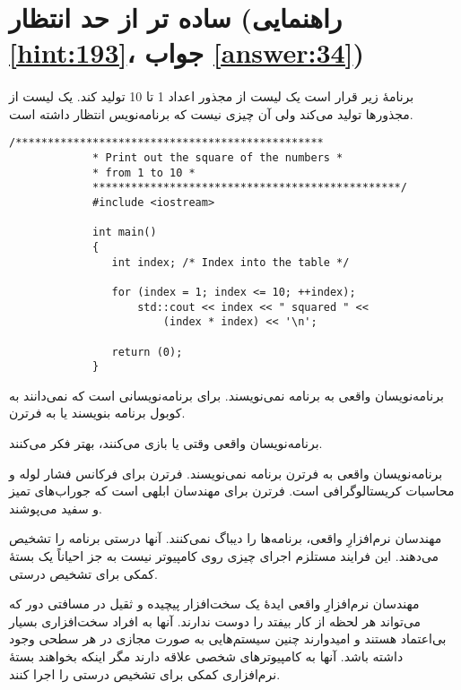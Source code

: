 \section[ساده تر از حد انتظار]{ساده تر از حد انتظار \protect{} (راهنمایی \ref{hint:193}، جواب \ref{answer:34})}
\paragraph{}\label{prog:20}
برنامهٔ زیر قرار است یک لیست از مجذور اعداد 1 تا 10 تولید کند. یک لیست از مجذورها تولید می‌کند ولی آن چیزی نیست که برنامه‌نویس انتظار داشته است.

\begin{LTR}
        \begin{lstlisting}[style=C++Style]
             /************************************************
             * Print out the square of the numbers *
             * from 1 to 10 *
             ************************************************/
             #include <iostream>

             int main()
             {
             	int index; /* Index into the table */

             	for (index = 1; index <= 10; ++index);
             		std::cout << index << " squared " <<
             			(index * index) << '\n';

             	return (0);
             }
        \end{lstlisting}
\end{LTR}

\begin{tcolorbox}
    برنامه‌نویسان واقعی به  برنامه نمی‌نویسند.  برای برنامه‌نویسانی است که نمی‌دانند به کوبول برنامه بنویسند یا به فرترن.

    برنامه‌نویسان واقعی وقتی  یا  بازی می‌کنند، بهتر فکر می‌کنند.

    برنامه‌نویسان واقعی به فرترن برنامه نمی‌نویسند. فرترن برای فرکانس فشار لوله و محاسبات کریستالوگرافی است. فرترن برای مهندسان ابلهی است که جوراب‌های تمیز و سفید می‌پوشند.

    مهندسان نرم‌افزارِ واقعی، برنامه‌ها را دیباگ نمی‌کنند. آنها درستی برنامه را تشخیص می‌دهند. این فرایند مستلزم اجرای چیزی روی کامپیوتر نیست به جز احیاناً یک بستهٔ کمکی برای تشخیص درستی.

    مهندسان نرم‌افزارِ واقعی ایدهٔ یک سخت‌افزار پیچیده و ثقیل در مسافتی دور که می‌تواند هر لحظه از کار بیفتد را دوست ندارند. آنها به افراد سخت‌افزاری بسیار بی‌اعتماد هستند و امیدوارند چنین سیستم‌هایی به صورت مجازی در هر سطحی وجود داشته باشد. آنها به کامپیوترهای شخصی علاقه دارند مگر اینکه بخواهند بستهٔ نرم‌افزاری کمکی برای تشخیص درستی را اجرا کنند.
\end{tcolorbox}